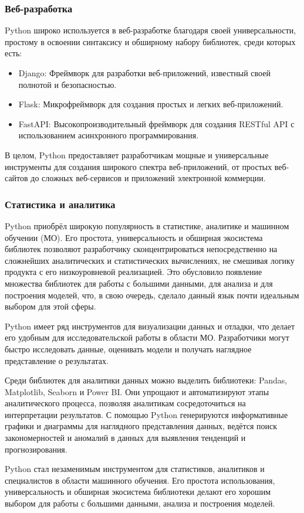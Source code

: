 \subsubsection{Веб-разработка}
Python широко используется в веб-разработке\cite{HABR_WHERE_PYTHON} благодаря своей универсальности, простому в освоении синтаксису и обширному набору библиотек, среди которых есть:
\begin{itemize}
    \item Django: Фреймворк для разработки веб-приложений, известный своей полнотой и безопасностью.
    \item Flask: Микрофреймворк для создания простых и легких веб-приложений.
    \item FastAPI: Высокопроизводительный фреймворк для создания RESTful API с использованием асинхронного программирования.
\end{itemize}

В целом, Python предоставляет разработчикам мощные и универсальные инструменты для создания широкого спектра веб-приложений, от простых веб-сайтов до сложных веб-сервисов и приложений электронной коммерции.


\subsubsection{Статистика и аналитика}

Python приобрёл широкую популярность в статистике, аналитике и машинном обучении (МО). Его простота, универсальность и обширная экосистема библиотек позволяют разработчику сконцентрироваться непосредственно на сложнейших аналитических и статистических вычислениях, не смешивая логику продукта с его низкоуровневой реализацией. Это обусловило появление множества библиотек для работы с большими данными, для анализа и для построения моделей, что, в свою очередь, сделало данный язык почти идеальным выбором для этой сферы.

Python имеет ряд инструментов для визуализации данных и отладки, что делает его удобным для исследовательской работы в области МО. Разработчики могут быстро исследовать данные, оценивать модели и получать наглядное представление о результатах.

Среди библиотек для аналитики данных можно выделить библиотеки: Pandas, Matplotlib, Seaborn и Power BI. Они упрощают и автоматизируют этапы аналитического процесса, позволяя аналитикам сосредоточиться на интерпретации результатов. С помощью Python генерируются информативные графики и диаграммы для наглядного представления данных, ведётся поиск закономерностей и аномалий в данных для выявления тенденций и прогнозирования.

Python стал незаменимым инструментом для статистиков, аналитиков и специалистов в области машинного обучения. Его простота использования, универсальность и обширная экосистема библиотеки делают его хорошим выбором для работы с большими данными, анализа и построения моделей.
